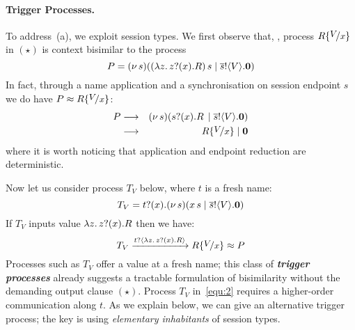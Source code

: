 \paragraph{Trigger Processes.} %
To address~(a), we exploit session types. 
We first 
observe that, , %
process $R\subst{V}{x}$ 
in $(\star)$
is context bisimilar to the process
	$$P = (\nu\, s)((\lambda z.\,z ? (x) .{R})\, {s} \;|\; \overline{s} ! \langle V \rangle . \mathbf{0})$$
In fact, {through a name application and a synchronisation on session endpoint $s$}
we do have $P \wbc R\subst{V}{x}$:
\begin{eqnarray*}%
	P & \red &  \newsp{s}{\appl{\binp{s}{x}{R}} \Par \bout{\dual{s}}{V} \inact} \\
	 & \red &  R\subst{V}{x} \Par \inact
\end{eqnarray*}
where it is worth noticing that 
application and endpoint reduction
are deterministic.  

Now let us
consider process $T_{V}$ below, where $t$ is a fresh name:
\begin{equation}
	\label{equ:2}
	T_{V} = \binp{t}{x} \newsp{s}{\appl{x}{s} \Par \bout{\dual{s}}{V} \inact }  %
\end{equation}
If $T_{V}$ inputs value $\lambda z.\,z ? (x) . R$ then
we have:
\begin{equation*}\label{equ:2a}
	T_{V}
	\by{\bactinp{t}{\abs{z}{\binp{z}{x} R}}} 
	R\subst{V}{x}
	\wbc 
	P
\end{equation*}
Processes such as $T_{V}$ 
offer a value at a fresh name; this class of 
{\bf\em trigger processes} 
already suggests a tractable formulation of 
bisimilarity without the demanding 
output 
clause $(\star)$. 
Process $T_{V}$ in~\eqref{equ:2} requires a higher-order communication along $t$.
As we explain below, we can give an alternative trigger process; the key is using \emph{elementary inhabitants} of session types.



